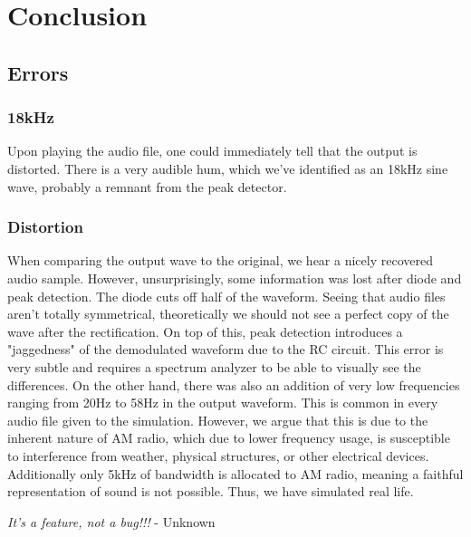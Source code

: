 \section{Conclusion}

\subsection{Errors}

    \subsubsection{18kHz}
        Upon playing the audio file, one could immediately tell that the output is distorted. There is a very audible hum, which we've identified as an 18kHz sine wave, probably a remnant from the peak detector. 
    \subsubsection{Distortion}
        When comparing the output wave to the original, we hear a nicely recovered audio sample. However, unsurprisingly, some information was lost after diode and peak detection. The diode cuts off half of the waveform. Seeing that audio files aren't totally symmetrical, theoretically we should not see a perfect copy of the wave after the rectification. On top of this, peak detection introduces a "jaggedness" of the demodulated waveform due to the RC circuit. This error is very subtle and requires a spectrum analyzer to be able to visually see the differences. On the other hand, there was also an addition of very low frequencies ranging from 20Hz to 58Hz in the output waveform. This is common in every audio file given to the simulation.
        However, we argue that this is due to the inherent nature of AM radio, which due to lower frequency usage, is susceptible to interference from weather, physical structures, or other electrical devices. Additionally only 5kHz of bandwidth is allocated to AM radio, meaning a faithful representation of sound is not possible. Thus, we have simulated real life.

        
\vspace{1cm}
        
        
        
\textit{It's a feature, not a bug!!!} -  Unknown